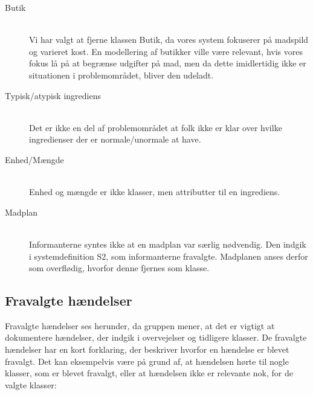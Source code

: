 \begin{description}
\item[Butik] \hfill \\
Vi har valgt at fjerne klassen Butik, da vores system fokuserer på madspild og varieret kost. En modellering af butikker ville være relevant, hvis vores fokus lå på at begrænse udgifter på mad, men da dette imidlertidig ikke er situationen i problemområdet, bliver den udeladt.

\item[Typisk/atypisk ingrediens] \hfill \\
Det er ikke en del af problemområdet at folk ikke er klar over hvilke ingredienser der er normale/unormale at have.

\item[Enhed/Mængde] \hfill \\
Enhed og mængde er ikke klasser, men attributter til en ingrediens.

\item[Madplan] \hfill \\
Informanterne syntes ikke at en madplan var særlig nødvendig. Den indgik i systemdefinition S2, som informanterne fravalgte. Madplanen anses derfor som overflødig, hvorfor denne fjernes som klasse.
\end{description}

\subsection{Fravalgte hændelser}
Fravalgte hændelser ses herunder, da gruppen mener, at det er vigtigt at dokumentere hændelser, der indgik i overvejelser og tidligere klasser. De fravalgte hændelser har en kort forklaring, der beskriver hvorfor en hændelse er blevet fravalgt. Det kan eksempelvis være på grund af, at hændelsen hørte til nogle klasser, som er blevet fravalgt, eller at hændelsen ikke er relevante nok, for de valgte klasser:

